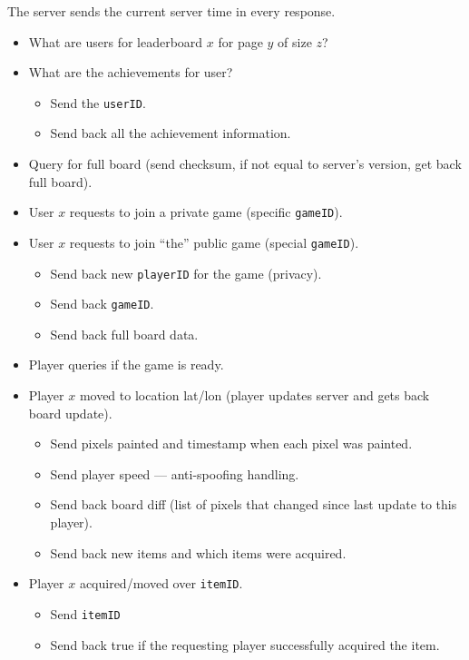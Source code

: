\documentclass[oneside,12pt]{scrbook}
\begin{document}


The server sends the current server time in every response.

\begin{itemize}
    \item What are users for leaderboard $x$ for page $y$ of size $z$?
    \item What are the achievements for user?
        \begin{itemize}
            \item Send the \texttt{userID}.
            \item Send back all the achievement information.
        \end{itemize}

    \item Query for full board (send checksum, if not equal to server's version, get back full board).

    \item User $x$ requests to join a private game (specific \texttt{gameID}).
    \item User $x$ requests to join ``the'' public game (special \texttt{gameID}).
        \begin{itemize}
            \item Send back new \texttt{playerID} for the game (privacy).
            \item Send back \texttt{gameID}.
            \item Send back full board data.
        \end{itemize}

    \item Player queries if the game is ready.

    \item Player $x$ moved to location lat/lon (player updates server and gets back board update).
        \begin{itemize}
            \item Send pixels painted and timestamp when each pixel was painted.
            \item Send player speed --- anti-spoofing handling.
            \item Send back board diff (list of pixels that changed since last update to this player).
            \item Send back new items and which items were acquired.
        \end{itemize}

    \item Player $x$ acquired/moved over \texttt{itemID}.
        \begin{itemize}
            \item Send \texttt{itemID}
            \item Send back true if the requesting player successfully acquired the item.
        \end{itemize}
\end{itemize}
\end{document}
